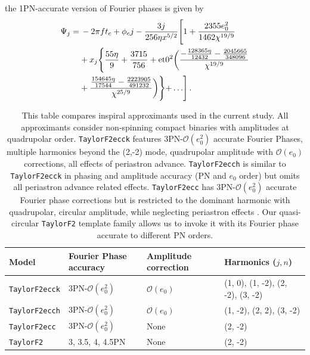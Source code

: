 \documentclass[aps,prd,twocolumn,superscriptaddress,groupedaddress,nofootinbib,showpacs,eqsecnum,useAms]{revtex4-2}
\begin{document}
the 1PN-accurate version of Fourier phases is given by
\begin{align}
\Psi_{j}= & \, -2 \pi  f t_c+ \phi_c j -\frac{3 j}{256 \eta  x^{5/2}}\Biggl[ 1+\frac{2355 e_0^2}{1462 \chi ^{19/9}} \notag \\
&+x_j \Biggl\{\frac{55 \eta }{9}+\frac{3715}{756} + \text{et0}^2 \biggr(\frac{-\frac{128365 \eta }{12432}-\frac{2045665}{348096}}{\chi ^{19/9}}\notag \\
&+\frac{\frac{154645 \eta }{17544}-\frac{2223905}{491232}}{\chi ^{25/9}}\biggr) \Biggl\} + \ldots\Biggr] \,. \label{eq:psi1PNEcch}
\end{align}
\begingroup
\renewcommand{\arraystretch}{1.5} %
\begin{center}
\begin{table}[ht!]
\begin{tabular}{lp{2.2cm}p{1.6cm}p{1.9cm}}
\hline\hline
Model & Fourier Phase \newline accuracy & Amplitude \newline correction & Harmonics \newline ($j, n$) \\
\hline
\texttt{TaylorF2ecck} & 3PN-$\mathcal{O}(e_0^2)$ & $\mathcal{O}(e_0)$ & (1, 0), (1, -2), (2, -2), (3, -2) \\
\texttt{TaylorF2ecch} & 3PN-$\mathcal{O}(e_0^2)$ & $\mathcal{O}(e_0)$ & (1, -2), (2, 2), (3, -2) \\
\texttt{TaylorF2ecc} & 3PN-$\mathcal{O}(e_0^2)$ & None & (2, -2) \\
\texttt{TaylorF2} & 3, 3.5, 4, 4.5PN & None & (2, -2) \\
\hline\hline
\end{tabular}
\caption{This table compares inspiral approximants used in the current study. All approximants consider non-spinning compact binaries with amplitudes at quadrupolar order. 
\texttt{TaylorF2ecck} features 3PN-$\mathcal{O}(e_0^2)$ accurate Fourier Phases, multiple harmonics beyond the (2,-2) mode, quadrupolar amplitude with $\mathcal{O}(e_0)$ corrections, all effects of periastron advance.
\texttt{TaylorF2ecch} is similar to \texttt{TaylorF2ecck} in phasing and amplitude accuracy (PN and $e_0$ order) but omits all periastron advance related effects. \texttt{TaylorF2ecc} has 3PN-$\mathcal{O}(e_0^2)$ accurate Fourier phase corrections but is restricted to the dominant harmonic with quadrupolar, circular amplitude, while neglecting  periastron effects \cite{Favata2022}. Our quasi-circular \texttt{TaylorF2} template family 
allows us to invoke it with its Fourier phase accurate to 
different PN orders.
}
\label{table:approximants}
\end{table}
\end{center}
\end{document}
